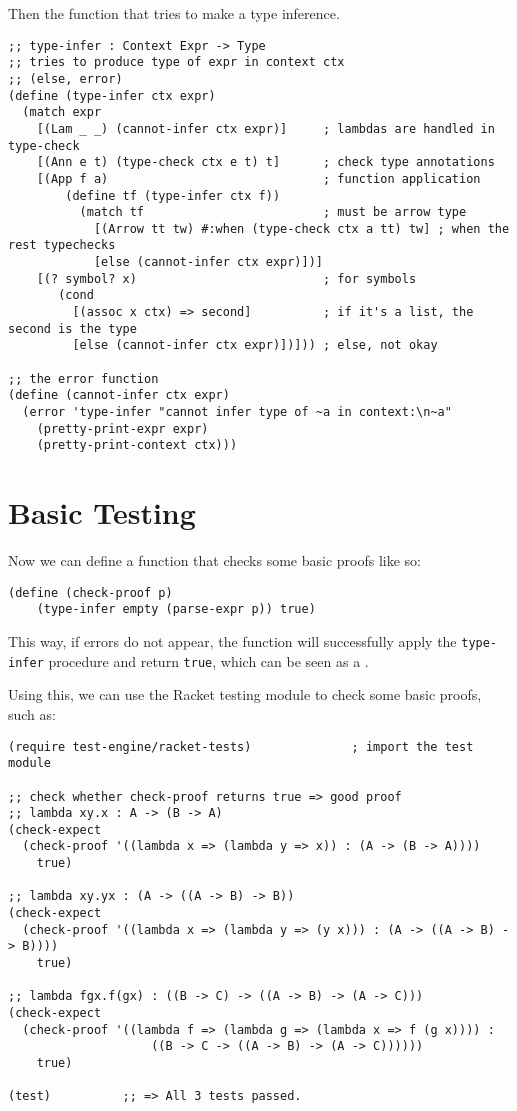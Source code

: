 Then the function that tries to make a type inference.
{
  \small
\begin{verbatim}
;; type-infer : Context Expr -> Type
;; tries to produce type of expr in context ctx
;; (else, error)
(define (type-infer ctx expr)
  (match expr
    [(Lam _ _) (cannot-infer ctx expr)]     ; lambdas are handled in type-check
    [(Ann e t) (type-check ctx e t) t]      ; check type annotations
    [(App f a)                              ; function application
        (define tf (type-infer ctx f))
          (match tf                         ; must be arrow type
            [(Arrow tt tw) #:when (type-check ctx a tt) tw] ; when the rest typechecks
            [else (cannot-infer ctx expr)])]
    [(? symbol? x)                          ; for symbols
       (cond
         [(assoc x ctx) => second]          ; if it's a list, the second is the type
         [else (cannot-infer ctx expr)])])) ; else, not okay

;; the error function
(define (cannot-infer ctx expr)
  (error 'type-infer "cannot infer type of ~a in context:\n~a"
    (pretty-print-expr expr)
    (pretty-print-context ctx)))
\end{verbatim}
}

\section{Basic Testing}

Now we can define a function that checks some basic proofs like so:
{
  \small
\begin{verbatim}
(define (check-proof p)
    (type-infer empty (parse-expr p)) true)
\end{verbatim}
}

This way, if errors do not appear, the function will successfully apply
the \texttt{type-infer} procedure and return \texttt{true}, which can be
seen as a .

Using this, we can use the Racket testing module to check some basic
proofs, such as:
{
  \small
\begin{verbatim}
(require test-engine/racket-tests)              ; import the test module

;; check whether check-proof returns true => good proof
;; lambda xy.x : A -> (B -> A)
(check-expect
  (check-proof '((lambda x => (lambda y => x)) : (A -> (B -> A))))
    true)

;; lambda xy.yx : (A -> ((A -> B) -> B))
(check-expect
  (check-proof '((lambda x => (lambda y => (y x))) : (A -> ((A -> B) -> B))))
    true)

;; lambda fgx.f(gx) : ((B -> C) -> ((A -> B) -> (A -> C)))
(check-expect
  (check-proof '((lambda f => (lambda g => (lambda x => f (g x)))) :
                    ((B -> C -> ((A -> B) -> (A -> C))))))
    true)

(test)          ;; => All 3 tests passed.
\end{verbatim}
}



